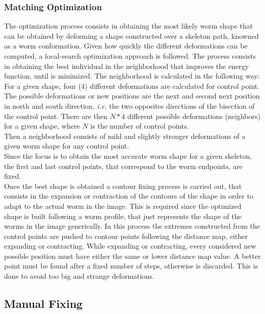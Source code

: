 \subsubsection*{Matching Optimization}

The optimization process consists in obtaining the most likely worm shape that can be
obtained by deforming a shape constructed over a skeleton path, knowned as a 
worm conformation. Given how quickly the different deformations can be computed,
a local-search optimization approach is followed. The process consists in obtaining the
best individual in the neighborhood that improves the energy function, until is 
minimized. The neighborhood is calculated in the following way:
For a given shape, four (4) different deformations are calculated for control point.
The possible deformations or new positions are the
next and second next position in north and south direction, \emph{i.e. }the two opposites
directions of the bisection of the control point.
There are then $N*4$ different possible deformations (neighbors) for a given shape,
where $N$ is the number of control points.\\ 
Then a neighborhood consists of mild and slightly stronger deformations of a given
worm shape for any control point.\\ Since the focus is to obtain the most accurate worm 
shape for a given skeleton, the
first and last control points, that correspond to the worm endpoints, are fixed.\\

Once the best shape is obtained a contour fixing process is carried out, that
consists in the expansion or contraction of the contours of the shape in order to adapt
to the actual worm in the image. This is required since the optimized shape is built 
following a worm profile, that just represents the shape of the worms in the image 
generically. In this process the extremes constructed from the control points are pushed
to contour points following the distance map, either expanding or contracting. While
expanding or contracting, every considered new possible position must have either the 
same or lower distance map value. A better point must be found after a fixed number
of steps, otherwise is discarded. This is done to avoid too big and strange deformations.


\subsection{Manual Fixing}

